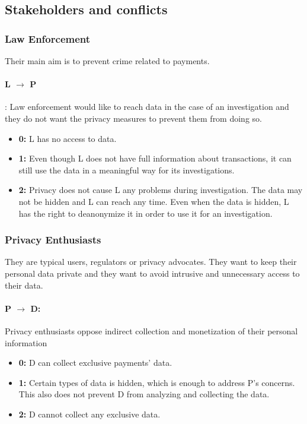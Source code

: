 \documentclass[runningheads]{llncs}
\begin{document}
 \subsection{Stakeholders and conflicts}
 \subsubsection{Law Enforcement}
  Their main aim is to prevent crime related to payments. 
  \paragraph{L $\rightarrow$ P}: Law enforcement would like to reach data in the case of an investigation and they do not want the privacy measures to prevent them from doing so.
  
  \begin{itemize}
  	\item \textbf{0:} L has no access to data. 
  	\item \textbf{1:} Even though L does not have full information about transactions, it can still use the data in a meaningful way for its investigations.
  	\item \textbf{2:} Privacy does not cause L any problems during investigation. The data may not be hidden and L can reach any time. Even when the data is hidden, L has the right to deanonymize it in order to use it for an investigation.
  \end{itemize}
  
  
 \subsubsection{Privacy Enthusiasts}
 They are typical users, regulators or privacy advocates. They want to keep their personal data private and they want to avoid intrusive and unnecessary access to their data.
 \paragraph{P $\rightarrow$ D:} Privacy enthusiasts oppose indirect collection and monetization of their personal information
 
   \begin{itemize}
 	\item \textbf{0:} D can collect exclusive payments' data. %
 	\item \textbf{1:} Certain types of data is hidden, which is enough to address P's concerns. This also does not prevent D from analyzing and collecting the data. 
 	\item \textbf{2:} D cannot collect any exclusive data.
 \end{itemize}
\end{document}
